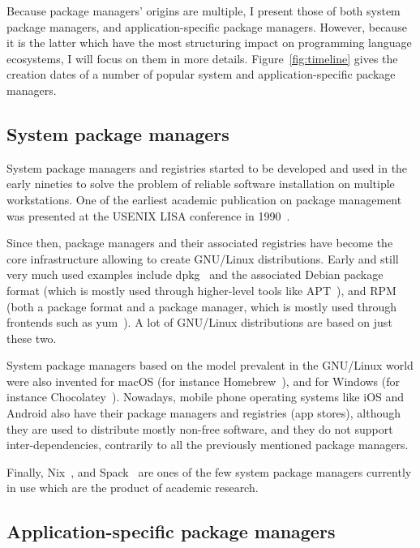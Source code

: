 Because package managers' origins are multiple, I present those of both system package managers, and application-specific package managers.
However, because it is the latter which have the most structuring impact on programming language ecosystems, I will focus on them in more details.
Figure~\ref{fig:timeline} gives the creation dates of a number of popular system and application-specific package managers.

\subsection{System package managers}

System package managers and registries started to be developed and used in the early nineties to solve the problem of reliable software installation on multiple workstations.
One of the earliest academic publication on package management was presented at the USENIX LISA conference in 1990~\cite{manheimer1990depot}.

Since then, package managers and their associated registries have become the core infrastructure allowing to create GNU/Linux distributions.
Early and still very much used examples include dpkg~\cite{dpkg} and the associated Debian package format (which is mostly used through higher-level tools like APT~\cite{apt}), and RPM~\cite{rpm} (both a package format and a package manager, which is mostly used through frontends such as yum~\cite{yum}).
A lot of GNU/Linux distributions are based on just these two.

System package managers based on the model prevalent in the GNU/Linux world were also invented for macOS (for instance Homebrew~\cite{homebrew}), and for Windows (for instance Chocolatey~\cite{chocolatey}).
Nowadays, mobile phone operating systems like iOS and Android also have their package managers and registries (app stores), although they are used to distribute mostly non-free software, and they do not support inter-dependencies, contrarily to all the previously mentioned package managers.

Finally, Nix~\cite{dolstra2004nix}, and Spack~\cite{gamblin2015spack}
are ones of the few system package managers currently in use which are
the product of academic research.

\subsection{Application-specific package managers}

